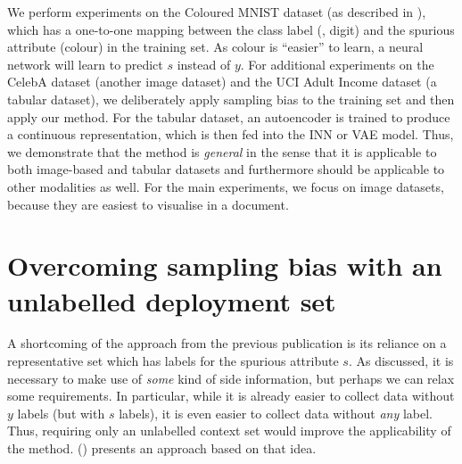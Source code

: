 We perform experiments on the Coloured MNIST dataset (as described in ),
which has a one-to-one mapping between the class label (\ie, digit) and the spurious attribute (colour)
in the training set.
As colour is ``easier'' to learn, a neural network will learn to predict \(s\) instead of \(y\).
For additional experiments on the CelebA dataset (another image dataset)
and the UCI Adult Income dataset (a tabular dataset),
we deliberately apply sampling bias to the training set and then apply our method.
For the tabular dataset, an autoencoder is trained to produce a continuous representation,
which is then fed into the \ac{INN} or \ac{VAE} model.
Thus, we demonstrate that the method is \emph{general}
in the sense that it is applicable to both image-based and tabular datasets
and furthermore should be applicable to other modalities as well.
For the main experiments, we focus on image datasets,
because they are easiest to visualise in a document.

\section{Overcoming sampling bias with an unlabelled deployment set}\label{sec:zsf}
A shortcoming of the approach from the previous publication \citep{kehrenberg2020nullsampling}
is its reliance on a representative set which has labels for the spurious attribute \(s\).
As discussed, it is necessary to make use of \emph{some} kind of side information,
but perhaps we can relax some requirements.
In particular, while it is already easier to collect data without \(y\) labels (but with \(s\) labels),
it is even easier to collect data without \emph{any} label.
Thus, requiring only an unlabelled context set would improve the applicability of the method.
\citet{kehrenberg2020zeroshot} () presents an approach based on that idea.

